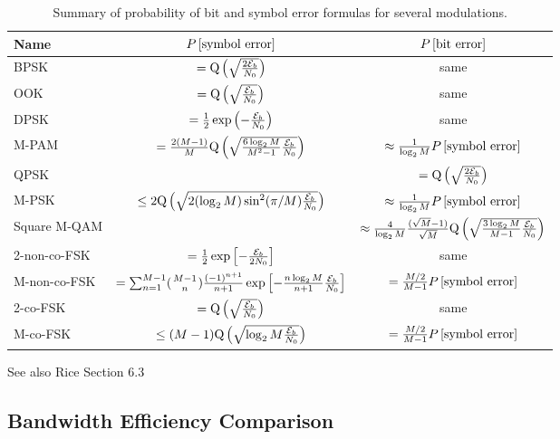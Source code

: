 \begin{table}
\begin{tabular}{|l|cc|}
\hline
 \bf Name & \bf $P\left[{\mbox{symbol error}}\right]$ & \bf $P\left[{\mbox{bit error}}\right]$ \\
\hline
 BPSK & $={\mbox{Q}\left( { \sqrt{\frac{2\mathcal{E}_b }{N_0}}} \right)}$ & same \\
 OOK  & $={\mbox{Q}\left( { \sqrt{\frac{\mathcal{E}_b }{N_0}}} \right)}$ & same \\
 DPSK & $=\frac{1}{2} \exp\left( -\frac{\mathcal{E}_b}{N_0} \right)$ & same \\
 M-PAM & $= \frac{2(M-1)}{M} {\mbox{Q}\left( {\sqrt{\frac{6 \log_2 M}{M^2-1} \frac{\mathcal{E}_b}{N_0}}} \right)}$ & 
         $\approx \frac{1}{\log_2 M} P\left[{\mbox{symbol error}}\right]$\\
 QPSK &  & $={\mbox{Q}\left( { \sqrt{\frac{2\mathcal{E}_b }{N_0}}} \right)}$ \\
 M-PSK &  $\le 2 {\mbox{Q}\left( {\sqrt{2 (\log_2 M)\sin^2(\pi/M) \frac{\mathcal{E}_b }{N_0}}} \right)}$  & $\approx \frac{1}{\log_2 M} P\left[{\mbox{symbol error}}\right]$ \\
 Square M-QAM &  & 
         $\approx \frac{4}{\log_2 M} \frac{(\sqrt{M}-1)}{\sqrt{M}} {\mbox{Q}\left( {\sqrt{\frac{3 \log_2 M}{M-1} \frac{\mathcal{E}_b}{N_0}}} \right)}$ \\
 2-non-co-FSK & $=\frac{1}{2} \exp \left[- \frac{\mathcal{E}_b}{2N_0} \right]$ & same \\
 M-non-co-FSK & $=\sum_{n=1}^{M-1}  ({M-1 \atop n})  \frac{(-1)^{n+1}}{n+1} \exp \left[ -\frac{n \log_2 M}{n+1} \frac{\mathcal{E}_b}{N_0}\right]$ 
              & $= \frac{M/2}{M-1} P\left[{\mbox{symbol error}}\right]$ \\  %
 2-co-FSK & $={\mbox{Q}\left( {\sqrt{\frac{\mathcal{E}_b}{N_0}}} \right)}$ & same \\
 M-co-FSK & $\le (M-1) {\mbox{Q}\left( { \sqrt{\log_2 M \frac{\mathcal{E}_b }{N_0}}} \right)}$ 
              & $= \frac{M/2}{M-1} P\left[{\mbox{symbol error}}\right]$ \\
\hline
\end{tabular}
\caption{Summary of probability of bit and symbol error formulas for several modulations.}
\end{table}  


See also Rice Section 6.3



\subsection{Bandwidth Efficiency Comparison}

